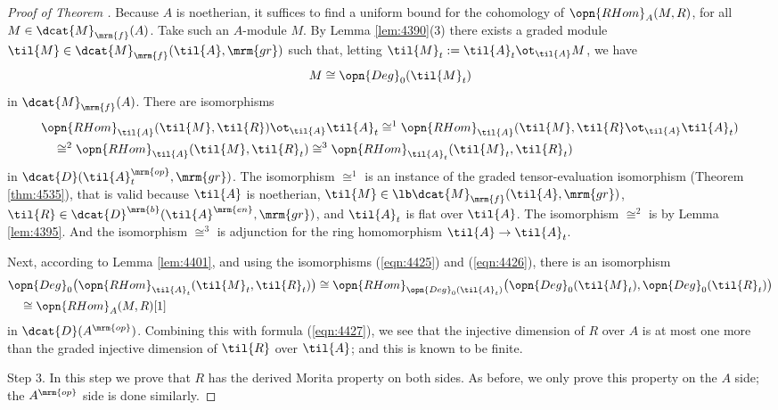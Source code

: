 \begin{proof}[Proof of Theorem \tup{\ref{thm:4395}}]
Because $A$ is noetherian, it suffices to find a uniform bound for the 
cohomology of $\opn{RHom}_{A}(M, R)$, for all $M \in \dcat{M}_{\mrm{f}}(A)$. 
Take such an $A$-module $M$. 
By Lemma \ref{lem:4390}(3) there exists a graded module  
$\til{M} \in \dcat{M}_{\mrm{f}}(\til{A}, \mrm{gr})$
such that, letting
$\til{M}_t := \til{A}_t \ot_{\til{A}} M$, we have 
\begin{equation} \label{eqn:4425}
M \cong \opn{Deg}_0(\til{M}_t) 
\end{equation} 
in $\dcat{M}_{\mrm{f}}(A)$. There are isomorphisms  
\begin{equation} \label{eqn:4427}
\begin{aligned}
&
\opn{RHom}_{\til{A}}(\til{M}, \til{R}) \ot_{\til{A}} \til{A}_t
\cong^1 \opn{RHom}_{\til{A}}(\til{M}, \til{R} \ot_{\til{A}} \til{A}_t)
\\
& \quad 
\cong^2 \opn{RHom}_{\til{A}}(\til{M}, \til{R}_t)
\cong^3 \opn{RHom}_{\til{A}_t}(\til{M}_t, \til{R}_t)
\end{aligned}
\end{equation}
in $\dcat{D}(\til{A}_t^{\mrm{op}}, \mrm{gr})$.
The isomorphism $\cong^1$ is an instance of the graded tensor-evaluation 
isomorphism (Theorem \ref{thm:4535}), that is valid because $\til{A}$ is 
noetherian, $\til{M} \in \lb \dcat{M}_{\mrm{f}}(\til{A}, \mrm{gr})$, 
$\til{R} \in \dcat{D}^{\mrm{b}}(\til{A}^{\mrm{en}}, \mrm{gr})$, 
and $\til{A}_t$ is flat over $\til{A}$. 
The isomorphism $\cong^2$ is by Lemma \ref{lem:4395}. 
And the isomorphism $\cong^3$ is adjunction for the ring homomorphism 
$\til{A} \to \til{A}_t$.
 
Next, according to Lemma \ref{lem:4401}, and using the isomorphisms 
(\ref{eqn:4425}) and (\ref{eqn:4426}), there is an isomorphism 
\[ \begin{aligned}
&
\opn{Deg}_0 \bigl( \opn{RHom}_{\til{A}_t}(\til{M}_t, \til{R}_t) \bigr) \cong
\opn{RHom}_{\opn{Deg}_0(\til{A}_t)} 
\bigl( \opn{Deg}_0(\til{M}_t), \opn{Deg}_0(\til{R}_t) \bigr)
\\ & \quad 
\cong \opn{RHom}_{A}(M, R)[1] 
\end{aligned} \]
in $\dcat{D}(A^{\mrm{op}})$. 
Combining this with formula (\ref{eqn:4427}), 
we see that the injective dimension of $R$ over $A$ is at most one more than 
the graded injective dimension of $\til{R}$ over $\til{A}$; and this is known 
to be finite.

\medskip \noindent
Step 3. In this step we prove that $R$ has the derived Morita property on both 
sides. As before, we only prove this property on the $A$ side; the 
$A^{\mrm{op}}$ side is done similarly. 


\end{proof}
